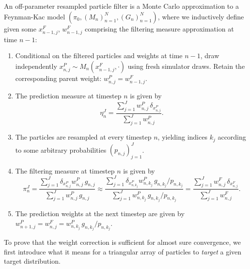 \begin{defn}
    \label{defn:off-parameter-filter}
    An off-parameter resampled particle filter is a Monte Carlo approximation to a Feynman-Kac model $\left(\pi_0,\left(M_n\right)_{n=1}^N,\left(G_n\right)_{n=1}^N\right)$, where we inductively define given some $x_{n-1,j}^F$, $w_{n-1,j}^F$ comprising the filtering measure approximation at time $n-1$:
    \begin{enumerate}
        \item Conditional on the filtered particles and weights at time $n-1$,
        draw independently $x_{n,j}^P\sim M_n(x_{n-1,j}^F,\cdot)$ using fresh
        simulator draws. Retain the corresponding parent weight:
        $w_{n,j}^P=w_{n-1,j}^F$.
        \item The prediction measure at timestep $n$ is given by 
        \begin{equation}
        \eta_n^J = \frac{\sum_{j=1}^J w_{n,j}^P \, \delta_{x_{n,j}^P}}{\sum_{j=1}^J w_{n,j}^P}.
        \end{equation}
        \item The particles are resampled at every timestep $n$, yielding indices $k_j$ according to some arbitrary probabilities $(p_{n,j})_{j=1}^J$.
        \item The filtering measure at timestep $n$ is given by
        \begin{equation}
        \pi_n^J = \frac{\sum_{j=1}^J \delta_{x_{n,j}^P } w_{n,j}^P \, g_{n,j}}{\sum_{j=1}^J w_{n,j}^P \, g_{n,j}} \approx \frac{\sum_{j=1}^J \delta_{x_{n,k_j}^P }w_{n,k_j}^P \, g_{n,k_j}\big/p_{n,k_j}}{\sum_{j=1}^J w_{n,k_j}^P\, g_{n,k_j}\big/p_{n,k_j}} = \frac{\sum_{j=1}^J w_{n,j}^F \, \delta_{x_{n,j}^F}}{\sum_{j=1}^J w_{n,j}^F}.
        \end{equation}
        \item The prediction weights at the next timestep are given by $w_{n+1,j}^P = w_{n,j}^F =  w_{n,k_j}^P \, g_{n,k_j}\big/p_{n,k_j}$.
    \end{enumerate}
\end{defn}

To prove that the weight correction is sufficient for almost sure convergence, we first introduce what it means for a triangular array of particles to \textit{target} a given target distribution. 

